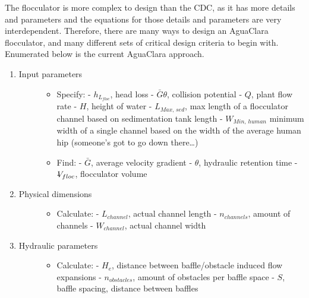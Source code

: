 \documentclass[letterpaper,10pt,english]{sphinxmanual}
\begin{document}
The flocculator is more complex to design than the CDC, as it has more details and parameters and the equations for those details and parameters are very interdependent. Therefore, there are many ways to design an AguaClara flocculator, and many different sets of critical design criteria to begin with. Enumerated below is the current AguaClara approach.
\begin{enumerate}
\item {} \begin{description}
\item[{Input parameters}] \leavevmode\begin{itemize}
\item {} 
Specify:
- \(h_{L_{floc}}\), head loss
- \(\bar G \theta\), collision potential
- \(Q\), plant flow rate
- \(H\), height of water 
- \(L_{Max, \, sed}\), max length of a flocculator channel based on sedimentation tank length
- \(W_{Min, \, human}\) minimum width of a single channel based on the width of the average human hip (someone’s got to go down there…)

\item {} 
Find:
- \(\bar G\), average velocity gradient
- \(\theta\), hydraulic retention time
- \(\rlap{-}V_{floc}\), flocculator volume

\end{itemize}

\end{description}

\item {} \begin{description}
\item[{Physical dimensions}] \leavevmode\begin{itemize}
\item {} 
Calculate:
- \(L_{channel}\), actual channel length
- \(n_{channels}\), amount of channels
- \(W_{channel}\), actual channel width

\end{itemize}

\end{description}

\item {} \begin{description}
\item[{Hydraulic parameters}] \leavevmode\begin{itemize}
\item {} 
Calculate:
- \(H_e\), distance between baffle/obstacle induced flow expansions
- \(n_{obstacles}\), amount of obstacles per baffle space
- \(S\), baffle spacing, distance between baffles

\end{itemize}

\end{description}

\end{enumerate}
\end{document}
